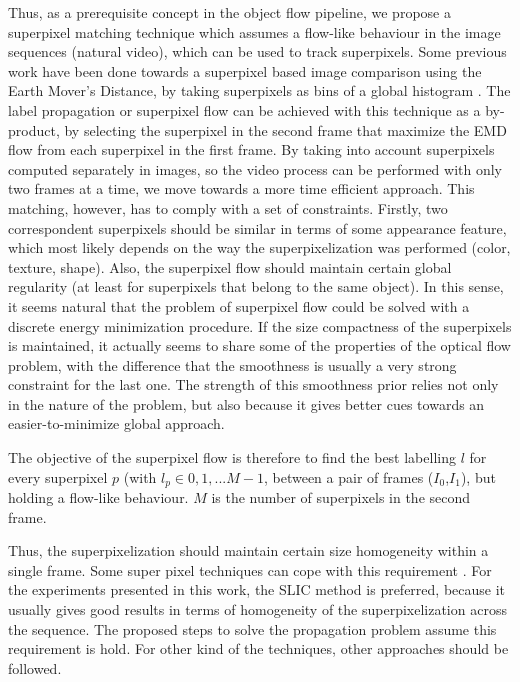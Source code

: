 Thus, as a prerequisite concept in the object flow pipeline, we propose a superpixel matching technique which assumes a flow-like behaviour in the image 
sequences (natural video), which can be used to track superpixels. 
Some previous work have been done towards a
superpixel based image comparison using the Earth Mover's Distance, by taking superpixels 
as bins of a global histogram \cite{c2}. The label propagation or superpixel flow can be
achieved with this technique as a by-product, by selecting the superpixel in the second frame that 
maximize the EMD flow from each superpixel in the first frame.
By taking into account superpixels computed separately in images, so the video process can be 
performed with only two frames at a time, we move towards a more time efficient approach. 
This matching, however, has to comply with a set of constraints. 
Firstly, two correspondent superpixels should be similar in terms of some appearance
feature, which most likely depends on the way the superpixelization was performed (color, texture,
shape). Also, the superpixel flow  should maintain certain global regularity (at least for
superpixels that belong to the same object). In this sense, it seems
natural that the problem of superpixel flow could be solved with a discrete energy minimization
procedure. 
If the size compactness of the superpixels is maintained,  it actually seems to 
share some of the properties of the optical flow problem, with the difference that the
smoothness is usually a very strong constraint for the last one. 
The strength of this smoothness prior relies not only in the nature of the problem, but also
because it gives better cues towards an easier-to-minimize global approach.

The objective of the superpixel flow is therefore to find the best labelling $l$ for every superpixel $p$ (with $l_p \in {0,1,...M-1}$, between a pair of frames ($I_{0}$,$I_{1}$), but holding a flow-like behaviour. $M$ is the number of superpixels in the second frame.

Thus, the superpixelization should maintain certain size homogeneity within a single frame. Some super
pixel techniques can cope with this requirement \cite{c9}\cite{c10}. For the experiments presented 
in this work, the SLIC method \cite{c9} is preferred, because it usually gives
good results in terms of homogeneity of the superpixelization across the sequence. 
The proposed steps to solve the propagation problem assume this requirement is hold. 
For other kind of the techniques, other approaches should be followed.

